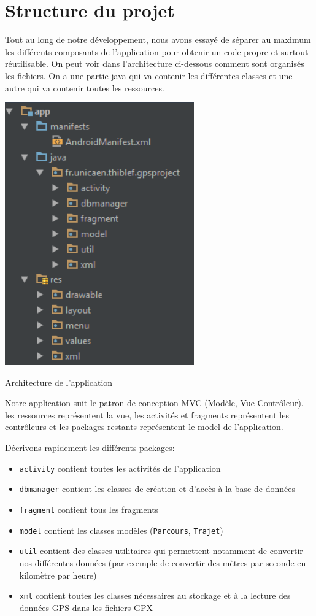 \section{Structure du projet}

Tout au long de notre développement, nous avons essayé de séparer au maximum les différents composants de l'application pour obtenir un code propre et surtout réutilisable. On peut voir dans l'architecture ci-dessous comment sont organisés les fichiers. On a une partie java qui va contenir les différentes classes et une autre qui va contenir toutes les ressources.\bigskip

\begin{img}
  \includegraphics[scale=0.6]{img/archi.png}
  \caption{Architecture de l'application}
\end{img}

Notre application suit le patron de conception MVC (Modèle, Vue Contrôleur). les ressources représentent la vue, les activités et fragments représentent les contrôleurs et les packages restants représentent le model de l'application.\bigskip

Décrivons rapidement les différents packages:\bigskip

\begin{itemize}
 	\item \verb!activity! contient toutes les activités de l'application
 	\item \verb!dbmanager! contient les classes de création et d'accès à la base de données
 	\item \verb!fragment! contient tous les fragments
 	\item \verb!model! contient les classes modèles (\verb!Parcours!, \verb!Trajet!)
 	\item \verb!util! contient des classes utilitaires qui permettent notamment de convertir nos différentes données (par exemple de convertir des mètres par seconde en kilomètre par heure)
 	\item \verb!xml! contient toutes les classes nécessaires au stockage et à la lecture des données GPS dans les fichiers GPX
\end{itemize}\bigskip
 



